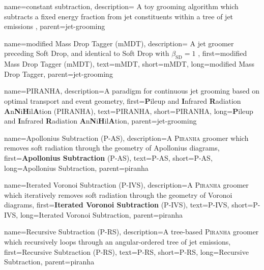     {
        name=constant subtraction,
        description={
            A toy grooming algorithm which subtracts a fixed energy fraction from jet constituents within a tree of jet emissions
        },
        parent=jet-grooming
    }

    {
        name=modified Mass Drop Tagger (mMDT),
        description={
            A jet groomer preceding Soft Drop, and identical to Soft Drop with \(\beta_\text{SD}=1\)
       },
        first={modified Mass Drop Tagger (mMDT)},
        text={mMDT},
        short={mMDT},
        long={modified Mass Drop Tagger},
        parent=jet-grooming
    }


    {
        name=\textsc{PIRANHA},
        description={A paradigm for continuous jet grooming based on optimal transport and event geometry},
        first={\textbf{P}ileup and \textbf{I}nfrared \textbf{R}adiation \textbf{A}n\textbf{N}i\textbf{H}il\textbf{A}tion (\textsc{PIRANHA})},
        text={\textsc{PIRANHA}},
        short={\textsc{PIRANHA}},
        long={\textbf{P}ileup and \textbf{I}nfrared \textbf{R}adiation \textbf{A}n\textbf{N}i\textbf{H}il\textbf{A}tion},
        parent=jet-grooming
    }


    {
        name=Apollonius Subtraction (P-AS),
        description={A \textsc{Piranha} groomer which removes soft radiation through the geometry of Apollonius diagrams},
        first={\textbf{Apollonius Subtraction} (P-AS)},
        text={P-AS},
        short={P-AS},
        long={Apollonius Subtraction},
        parent=piranha
    }

    {
        name=Iterated Voronoi Subtraction (P-IVS),
        description={A \textsc{Piranha} groomer which iteratively removes soft radiation through the geometry of Voronoi diagrams},
        first={\textbf{Iterated Voronoi Subtraction} (P-IVS)},
        text={P-IVS},
        short={P-IVS},
        long={Iterated Voronoi Subtraction},
        parent=piranha
    }

    {
        name=Recursive Subtraction (P-RS),
        description={A tree-based \textsc{Piranha} groomer which recursively loops through an angular-ordered tree of jet emissions},
        first={Recursive Subtraction (P-RS)},
        text={P-RS},
        short={P-RS},
        long={Recursive Subtraction},
        parent=piranha
    }

